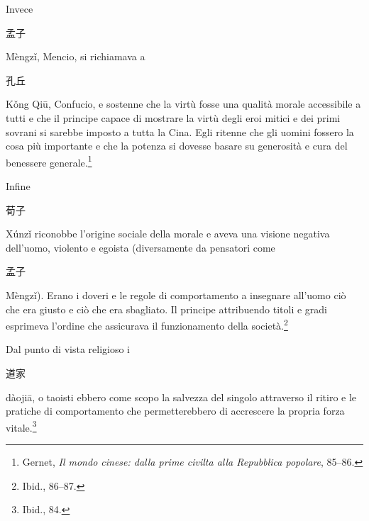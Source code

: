 \documentclass[12pt,titlepage]{article}
\begin{document}
Invece 
\begin{CJK*}{UTF8}{gbsn}孟子 \end{CJK*} Mèngzǐ, Mencio, si richiamava a 
\begin{CJK*}{UTF8}{gbsn}孔丘 \end{CJK*} Kǒng Qiū, Confucio, e sostenne che la virtù fosse una qualità morale accessibile a tutti e che il principe capace di mostrare la virtù degli eroi mitici e dei primi sovrani si sarebbe imposto a tutta la Cina. Egli ritenne che gli uomini fossero la cosa più importante e che la potenza si dovesse basare su generosità e cura del benessere generale.\footnote{Gernet, \emph{Il mondo cinese: dalla prime civilta alla Repubblica popolare}, 85–86.}

Infine \begin{CJK*}{UTF8}{gbsn}荀子 \end{CJK*} Xúnzǐ riconobbe l'origine sociale della morale e aveva una visione negativa dell'uomo, violento e egoista (diversamente da pensatori come 
\begin{CJK*}{UTF8}{gbsn}孟子 \end{CJK*} Mèngzǐ). Erano i doveri e le regole di comportamento a insegnare all'uomo ciò che era giusto e ciò che era sbagliato. Il principe attribuendo titoli e gradi esprimeva l'ordine che assicurava il funzionamento della società.\footnote{Ibid., 86–87.}

Dal punto di vista religioso i 
\begin{CJK*}{UTF8}{gbsn}道家\end{CJK*} dàojiā, o taoisti ebbero come scopo la salvezza del singolo attraverso il ritiro e le pratiche di comportamento che permetterebbero di accrescere la propria forza vitale.\footnote{Ibid., 84.}
\end{document}
